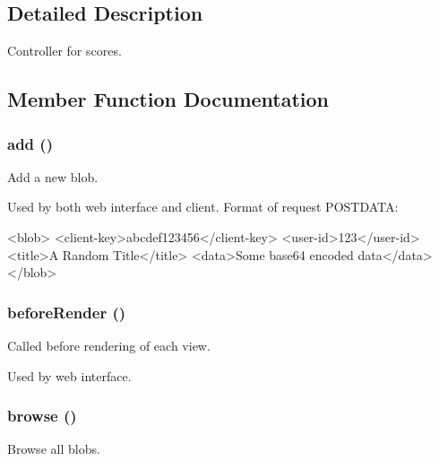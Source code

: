 \subsection{Detailed Description}
Controller for scores. 

\subsection{Member Function Documentation}
\hypertarget{class_blobs_controller_a837ba24a1c3095ae67613238d866f79a}{
\subsubsection[{add}]{\setlength{\rightskip}{0pt plus 5cm}add ()}}
\label{class_blobs_controller_a837ba24a1c3095ae67613238d866f79a}


Add a new blob. 

Used by both web interface and client. Format of request POSTDATA: 
\begin{DoxyCode}
 <blob>
   <client-key>abcdef123456</client-key>
   <user-id>123</user-id>
   <title>A Random Title</title>
   <data>Some base64 encoded data</data>
 </blob>
\end{DoxyCode}
 \hypertarget{class_blobs_controller_ac89dd29d2229bbc37879d31f95d06e97}{
\subsubsection[{beforeRender}]{\setlength{\rightskip}{0pt plus 5cm}beforeRender ()}}
\label{class_blobs_controller_ac89dd29d2229bbc37879d31f95d06e97}


Called before rendering of each view. 

Used by web interface. \hypertarget{class_blobs_controller_af41f268d662f2a4ffbe597d0580467a1}{
\subsubsection[{browse}]{\setlength{\rightskip}{0pt plus 5cm}browse ()}}
\label{class_blobs_controller_af41f268d662f2a4ffbe597d0580467a1}


Browse all blobs. 

